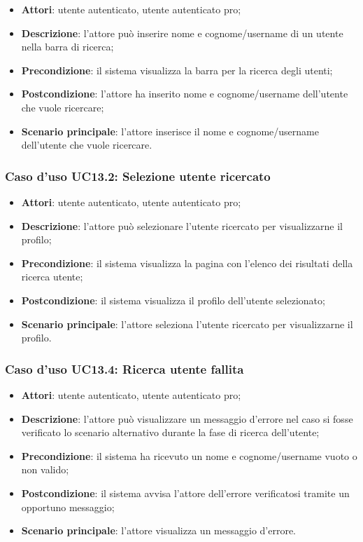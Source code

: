 \begin{itemize}
	\item \textbf{Attori}: utente autenticato, utente autenticato pro;
	\item \textbf{Descrizione}: l'attore può inserire nome e cognome/username di un utente nella barra di ricerca;
	\item \textbf{Precondizione}: il sistema visualizza la barra per la ricerca degli utenti;
	\item \textbf{Postcondizione}: l'attore ha inserito nome e cognome/username dell'utente che vuole ricercare;
	\item \textbf{Scenario principale}: l'attore inserisce il nome e cognome/username dell'utente che vuole ricercare.
\end{itemize}

\subsubsection{Caso d'uso UC13.2: Selezione utente ricercato}

\begin{itemize}
	\item \textbf{Attori}: utente autenticato, utente autenticato pro;
	\item \textbf{Descrizione}: l'attore può selezionare l'utente ricercato per visualizzarne il profilo;
	\item \textbf{Precondizione}: il sistema visualizza la pagina con l'elenco dei risultati della ricerca utente;
	\item \textbf{Postcondizione}: il sistema visualizza il profilo dell'utente selezionato;
	\item \textbf{Scenario principale}: l'attore seleziona l'utente ricercato per visualizzarne il profilo.
\end{itemize}

\subsubsection{Caso d'uso UC13.4: Ricerca utente fallita}

\begin{itemize}
	\item \textbf{Attori}: utente autenticato, utente autenticato pro;
	\item \textbf{Descrizione}: l'attore può visualizzare un messaggio d'errore nel caso si fosse verificato lo scenario alternativo durante la fase di ricerca dell'utente;
	\item \textbf{Precondizione}: il sistema ha ricevuto un nome e cognome/username vuoto o non valido;
	\item \textbf{Postcondizione}: il sistema avvisa l'attore dell'errore verificatosi tramite un opportuno messaggio;
\item\textbf{Scenario principale}: l'attore visualizza un messaggio d'errore.
\end{itemize}